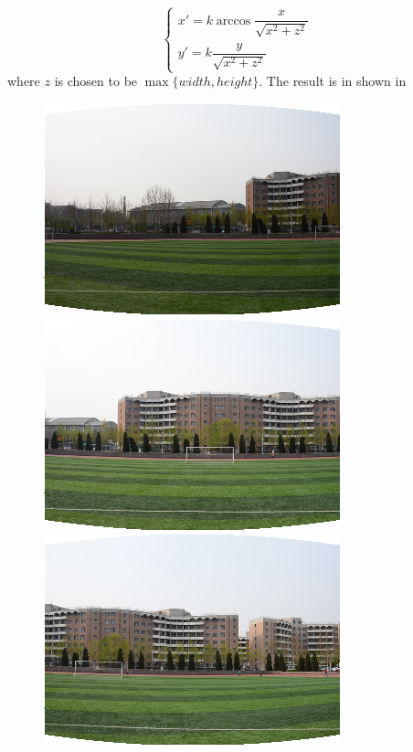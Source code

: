 \begin{enumerate}
\[  \begin{cases}
  x' = k\arccos{\dfrac{x}{\sqrt{x^2 + z^2}}}\\
  y' = k\dfrac{y}{\sqrt{x^2 + z^2}}
\end{cases}\]
where $ z$ is chosen to be $ \max\{width, height\}$.  The result is in shown in 
\begin{figure}[H]
  \centering
  \begin{minipage}[b]{0.24\linewidth}
    \includegraphics[scale=0.3]{res/1.png}
  \end{minipage}
  \begin{minipage}[b]{0.24\linewidth}
    \includegraphics[scale=0.3]{res/2.png}
  \end{minipage}
  \begin{minipage}[b]{0.24\linewidth}
    \includegraphics[scale=0.3]{res/3.png}

\end{minipage}
\end{figure}
\end{enumerate}

